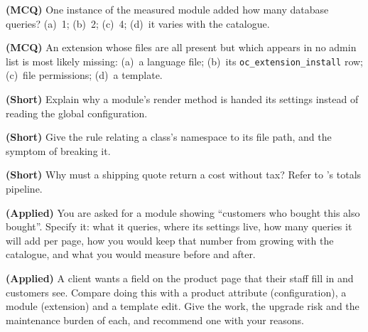 \begin{reviewq}
  \item \textbf{(MCQ)} One instance of the measured module added how many
        database queries? (a)~1; (b)~2; (c)~4; (d)~it varies with the
        catalogue.
  \item \textbf{(MCQ)} An extension whose files are all present but which
        appears in no admin list is most likely missing: (a)~a language file;
        (b)~its \texttt{oc\_extension\_install} row; (c)~file permissions;
        (d)~a template.
  \item \textbf{(Short)} Explain why a module's render method is handed its
        settings instead of reading the global configuration.
  \item \textbf{(Short)} Give the rule relating a class's namespace to its file
        path, and the symptom of breaking it.
  \item \textbf{(Short)} Why must a shipping quote return a cost without tax?
        Refer to 's totals pipeline.
  \item \textbf{(Applied)} You are asked for a module showing ``customers who
        bought this also bought''. Specify it: what it queries, where its
        settings live, how many queries it will add per page, how you would
        keep that number from growing with the catalogue, and what you would
        measure before and after.
  \item \textbf{(Applied)} A client wants a field on the product page that
        their staff fill in and customers see. Compare doing this with a
        product attribute (configuration), a module (extension) and a template
        edit. Give the work, the upgrade risk and the maintenance burden of
        each, and recommend one with your reasons.
\end{reviewq}
